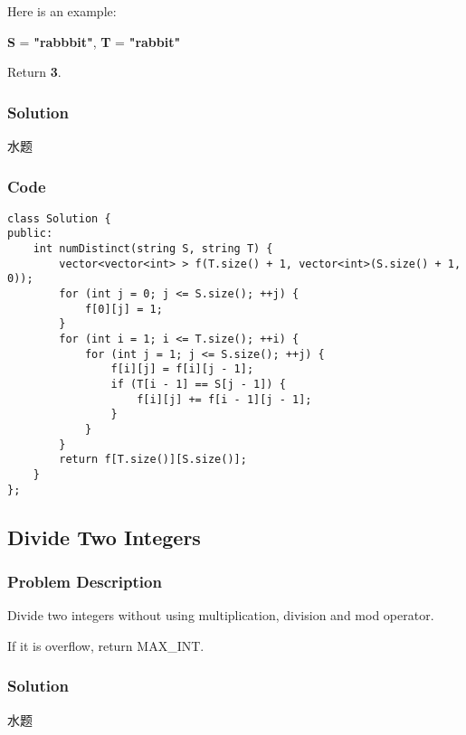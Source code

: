 \documentclass[courier]{article}
\begin{document}
\begin{CJK*}{UTF8}{gkai}
Here is an example:


\textbf{S} = \textbf{"rabbbit"}, \textbf{T} = \textbf{"rabbit"}

Return \textbf{3}.



\subsubsection*{Solution}
水题

\subsubsection*{Code}
\begin{lstlisting}
class Solution {
public:
    int numDistinct(string S, string T) {
        vector<vector<int> > f(T.size() + 1, vector<int>(S.size() + 1, 0));
        for (int j = 0; j <= S.size(); ++j) {
            f[0][j] = 1;
        }
        for (int i = 1; i <= T.size(); ++i) {
            for (int j = 1; j <= S.size(); ++j) {
                f[i][j] = f[i][j - 1];
                if (T[i - 1] == S[j - 1]) {
                    f[i][j] += f[i - 1][j - 1];
                }
            }
        }
        return f[T.size()][S.size()];
    }
}; 
\end{lstlisting}


\subsection{ Divide Two Integers }

\subsubsection*{Problem Description}
Divide two integers without using multiplication, division and mod operator.

If it is overflow, return MAX\_INT.



\subsubsection*{Solution}
水题


\end{CJK*}
\end{document}
